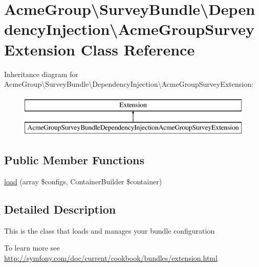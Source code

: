 \hypertarget{class_acme_group_1_1_survey_bundle_1_1_dependency_injection_1_1_acme_group_survey_extension}{\section{Acme\+Group\textbackslash{}Survey\+Bundle\textbackslash{}Dependency\+Injection\textbackslash{}Acme\+Group\+Survey\+Extension Class Reference}
\label{class_acme_group_1_1_survey_bundle_1_1_dependency_injection_1_1_acme_group_survey_extension}
}
Inheritance diagram for Acme\+Group\textbackslash{}Survey\+Bundle\textbackslash{}Dependency\+Injection\textbackslash{}Acme\+Group\+Survey\+Extension\+:\begin{figure}[H]
\begin{center}
\leavevmode
\includegraphics[height=2.000000cm]{class_acme_group_1_1_survey_bundle_1_1_dependency_injection_1_1_acme_group_survey_extension}
\end{center}
\end{figure}
\subsection*{Public Member Functions}
\begin{DoxyCompactItemize}
\item 
\hyperlink{class_acme_group_1_1_survey_bundle_1_1_dependency_injection_1_1_acme_group_survey_extension_a3d4321b4e3f08ebc8e199dca9002b2c0}{load} (array \$configs, Container\+Builder \$container)
\end{DoxyCompactItemize}


\subsection{Detailed Description}
This is the class that loads and manages your bundle configuration

To learn more see \hyperlink{}{http\+://symfony.\+com/doc/current/cookbook/bundles/extension.\+html} 

